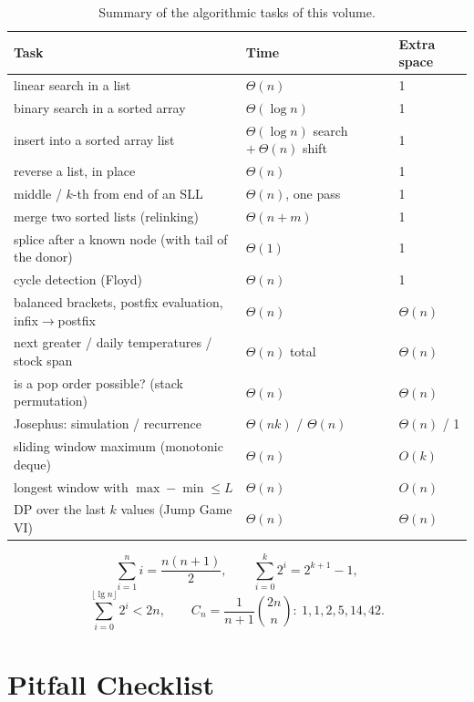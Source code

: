 \begin{table}[ht]\centering\small
\begin{tabular}{@{}lll@{}}\toprule
Task & Time & Extra space\\\midrule
linear search in a list & $\Theta(n)$ & 1\\
binary search in a sorted array & $\Theta(\log n)$ & 1\\
insert into a sorted array list & $\Theta(\log n)$ search $+\ \Theta(n)$ shift & 1\\
reverse a list, in place & $\Theta(n)$ & 1\\
middle / $k$-th from end of an SLL & $\Theta(n)$, one pass & 1\\
merge two sorted lists (relinking) & $\Theta(n+m)$ & 1\\
splice after a known node (with tail of the donor) & $\Theta(1)$ & 1\\
cycle detection (Floyd) & $\Theta(n)$ & 1\\
balanced brackets, postfix evaluation, infix$\to$postfix & $\Theta(n)$ & $\Theta(n)$\\
next greater / daily temperatures / stock span & $\Theta(n)$ total & $\Theta(n)$\\
is a pop order possible? (stack permutation) & $\Theta(n)$ & $\Theta(n)$\\
Josephus: simulation / recurrence & $\Theta(nk)$ / $\Theta(n)$ & $\Theta(n)$ / 1\\
sliding window maximum (monotonic deque) & $\Theta(n)$ & $O(k)$\\
longest window with $\max-\min\le L$ & $\Theta(n)$ & $O(n)$\\
DP over the last $k$ values (Jump Game VI) & $\Theta(n)$ & $\Theta(n)$\\\bottomrule
\end{tabular}
\caption{Summary of the algorithmic tasks of this volume.}
\end{table}

\[\sum_{i=1}^{n}i=\frac{n(n+1)}{2},\qquad\sum_{i=0}^{k}2^i=2^{k+1}-1,\]
\[\sum_{i=0}^{\lfloor\lg n\rfloor}2^i<2n,\qquad C_n=\frac{1}{n+1}\binom{2n}{n}:\ 1,1,2,5,14,42.\]

\chapter{Pitfall Checklist}\label{app:pitfalls}

